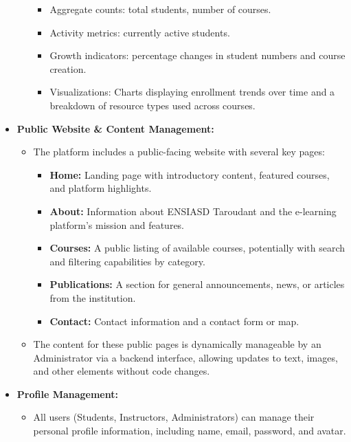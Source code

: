 \documentclass[12pt,a4paper]{article}
\begin{document}
\begin{itemize}
\begin{itemize}
        \begin{itemize}
            \item Aggregate counts: total students, number of courses.
            \item Activity metrics: currently active students.
            \item Growth indicators: percentage changes in student numbers and course creation.
            \item Visualizations: Charts displaying enrollment trends over time and a breakdown of resource types used across courses.
        \end{itemize}
    \end{itemize}
    \item \textbf{Public Website \& Content Management:}
    \begin{itemize}
        \item The platform includes a public-facing website with several key pages:
        \begin{itemize}
            \item \textbf{Home:} Landing page with introductory content, featured courses, and platform highlights.
            \item \textbf{About:} Information about ENSIASD Taroudant and the e-learning platform's mission and features.
            \item \textbf{Courses:} A public listing of available courses, potentially with search and filtering capabilities by category.
            \item \textbf{Publications:} A section for general announcements, news, or articles from the institution.
            \item \textbf{Contact:} Contact information and a contact form or map.
        \end{itemize}
        \item The content for these public pages is dynamically manageable by an Administrator via a backend interface, allowing updates to text, images, and other elements without code changes.
    \end{itemize}
    \item \textbf{Profile Management:}
    \begin{itemize}
        \item All users (Students, Instructors, Administrators) can manage their personal profile information, including name, email, password, and avatar.
    \end{itemize}
\end{itemize}
\clearpage
\end{document}
